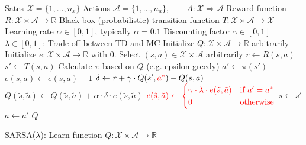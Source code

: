 \documentclass{article}
\DeclareMathOperator*{\argmax}{arg\,max}
\begin{document}
\begin{preview}
    \begin{algorithm}[H]
        \begin{algorithmic}
        \Require
        \Statex Sates $\mathcal{X} = \{1, \dots, n_x\}$
        \Statex Actions $\mathcal{A} = \{1, \dots, n_a\},\qquad A: \mathcal{X} \Rightarrow \mathcal{A}$
        \Statex Reward function $R: \mathcal{X} \times \mathcal{A} \rightarrow \mathbb{R}$
        \Statex Black-box (probabilistic) transition function $T: \mathcal{X} \times \mathcal{A} \rightarrow \mathcal{X}$
        \Statex Learning rate $\alpha \in [0, 1]$, typically $\alpha = 0.1$
        \Statex Discounting factor $\gamma \in [0, 1]$
        \Statex $\lambda \in [0, 1]$: Trade-off between TD and MC
            \State Initialize $Q: \mathcal{X} \times \mathcal{A} \rightarrow \mathbb{R}$ arbitrarily
            \State Initialize $e: \mathcal{X} \times \mathcal{A} \rightarrow \mathbb{R}$ with 0. 
                \State Select $(s, a) \in \mathcal{X} \times \mathcal{A}$ arbitrarily
                    \State $r \gets R(s, a)$
                    \State $s' \gets T(s, a)$ 
                    \State Calculate $\pi$ based on $Q$ (e.g. epsilon-greedy)
                    \State {$\color{red} a^* \gets \argmax_{\tilde{a}} Q(s', \tilde{a})$}
                    \State $a' \gets \pi(s')$
                    \State $e(s, a) \gets e(s, a) + 1$
                    \State $\delta \gets r + \gamma \cdot Q(s', {\color{red} a^*}) - Q(s, a)$
                        \State $Q(\tilde{s}, \tilde{a}) \gets Q(\tilde{s}, \tilde{a}) + \alpha \cdot \delta \cdot e(\tilde{s}, \tilde{a})$
                        \State ${\color{red} e(\tilde{s}, \tilde{a}) \gets \begin{cases}\gamma \cdot \lambda \cdot e(\tilde{s}, \tilde{a})&\text{if } a' = a^*\\
                                     0 &\text{otherwise}\end{cases}}$
                    \EndFor
                    \State $s \gets s'$
                    \State $a \gets a'$
                \EndWhile
            \EndWhile
            \Return $Q$
        \EndProcedure
        \end{algorithmic}
    \caption{SARSA($\lambda$): Learn function $Q: \mathcal{X} \times \mathcal{A} \rightarrow \mathbb{R}$}
    \label{alg:sarsa-lambda}
    \end{algorithm}
\end{preview}
\end{document}
